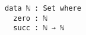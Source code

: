 \documentclass{article}
\begin{document}
\begin{verbatim}
data ℕ : Set where
  zero : ℕ
  succ : ℕ → ℕ
\end{verbatim}
\end{document}
